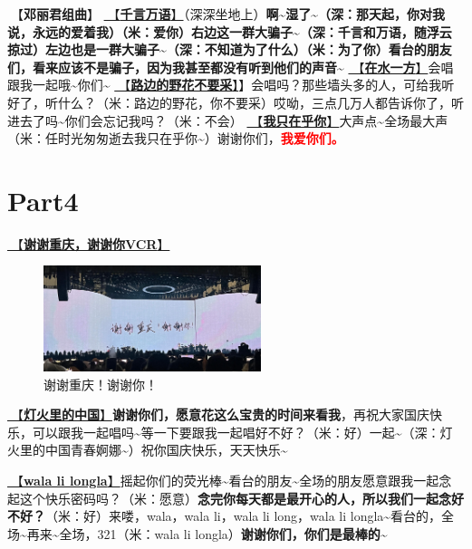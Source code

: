 \documentclass[]{ctexbook}
\begin{document}
🎵【\textbf{邓丽君组曲}】
\hyperref[thousands-of-words]{🎵【\textbf{千言万语}】}（深深坐地上）\textbf{啊\textasciitilde 湿了\textasciitilde（深：那天起，你对我说，永远的爱着我）（米：爱你）右边这一群大骗子\textasciitilde（深：千言和万语，随浮云掠过）左边也是一群大骗子\textasciitilde（深：不知道为了什么）（米：为了你）看台的朋友们，看来应该不是骗子，因为我甚至都没有听到他们的声音\textasciitilde{}}
\hyperref[on-the-water-side]{🎵【\textbf{在水一方}】}会唱跟我一起哦\textasciitilde 你们\textasciitilde{}
\hyperref[only-with-me]{🎵【\textbf{路边的野花不要采}】}】会唱吗？那些墙头多的人，可给我听好了，听什么？（米：路边的野花，你不要采）哎呦，三点几万人都告诉你了，听进去了吗\textasciitilde 你们会忘记我吗？（米：不会）
\hyperref[only-you]{🎵【\textbf{我只在乎你}】}大声点\textasciitilde 全场最大声（米：任时光匆匆逝去我只在乎你\textasciitilde）谢谢你们，\textbf{\textcolor{red}{我爱你们。} }

\section{Part4}\label{chongqing-20241007-part4}

\hyperref[thank-you-vcr]{🎥【\textbf{谢谢重庆，谢谢你VCR}】}

\begin{figure}

{\centering \includegraphics[width=180pt]{img/chongqing20241007/thank-chongqing} 

}

\caption{谢谢重庆！谢谢你！}\label{fig:unnamed-chunk-108}
\end{figure}

\hyperref[China-in-the-light]{🎵【\textbf{灯火里的中国}】}\textbf{谢谢你们，愿意花这么宝贵的时间来看我}，再祝大家国庆快乐，可以跟我一起唱吗\textasciitilde 等一下要跟我一起唱好不好？（米：好）一起\textasciitilde（深：灯火里的中国青春婀娜\textasciitilde）祝你国庆快乐，天天快乐\textasciitilde{}

\hyperref[wala-li-longla]{🎵【\textbf{wala li longla}】}摇起你们的荧光棒\textasciitilde 看台的朋友\textasciitilde 全场的朋友愿意跟我一起念起这个快乐密码吗？（米：愿意）\textbf{念完你每天都是最开心的人，所以我们一起念好不好？}（米：好）来喽，wala，wala li，wala li long，wala li longla\textasciitilde 看台的，全场\textasciitilde 再来\textasciitilde 全场，321（米：wala li longla）\textbf{谢谢你们，你们是最棒的\textasciitilde{}}
\end{document}
